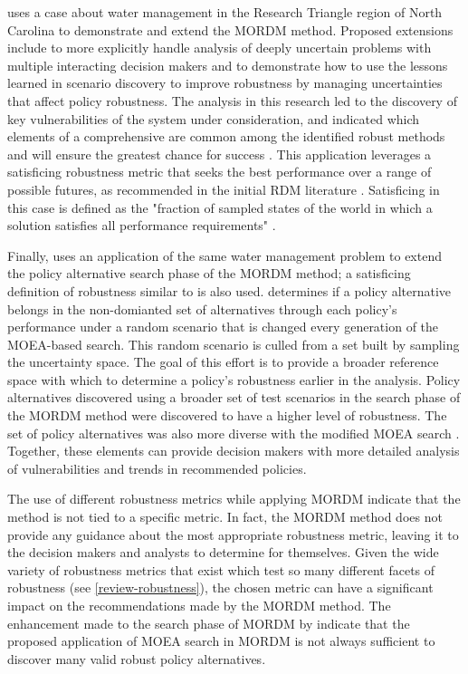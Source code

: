         \citet{Herman2014} uses a case about water management in the Research Triangle region of North Carolina to demonstrate and extend the MORDM method. Proposed extensions include to more explicitly handle analysis of deeply uncertain problems with multiple interacting decision makers and to demonstrate how to use the lessons learned in scenario discovery to improve robustness by managing uncertainties that affect policy robustness. The analysis in this research led to the discovery of key vulnerabilities of the system under consideration, and indicated which elements of a comprehensive are common among the identified robust methods and will ensure the greatest chance for success \citep{Herman2014}. This application leverages a satisficing robustness metric that seeks the best performance over a range of possible futures, as recommended in the initial RDM literature \citep{Lempert2007}. Satisficing in this case is defined as the "fraction of sampled states of the world in which a solution satisfies all performance requirements" \citep{Herman2014}. 

        Finally, \citet{Trindade2017} uses an application of the same water management problem to extend the policy alternative search phase of the MORDM method; a satisficing definition of robustness similar to \citet{Herman2014} is also used. \citet{Trindade2017} determines if a policy alternative belongs in the non-domianted set of alternatives through each policy's performance under a random scenario that is changed every generation of the MOEA-based search. This random scenario is culled from a set built by sampling the uncertainty space. The goal of this effort is to provide a broader reference space with which to determine a policy's robustness earlier in the analysis. Policy alternatives discovered using a broader set of test scenarios in the search phase of the MORDM method were discovered to have a higher level of robustness. The set of policy alternatives was also more diverse with the modified MOEA search \citep{Trindade2017}. Together, these elements can provide decision makers with more detailed analysis of vulnerabilities and trends in recommended policies. 
        
        The use of different robustness metrics while applying MORDM indicate that the method is not tied to a specific metric. In fact, the MORDM method does not provide any guidance about the most appropriate robustness metric, leaving it to the decision makers and analysts to determine for themselves. Given the wide variety of robustness metrics that exist which test so many different facets of robustness (see \cref{review-robustness}), the chosen metric can have a significant impact on the recommendations made by the MORDM method. The enhancement made to the search phase of MORDM by \citet{Trindade2017} indicate that the proposed application of MOEA search in MORDM is not always sufficient to discover many valid robust policy alternatives. 

